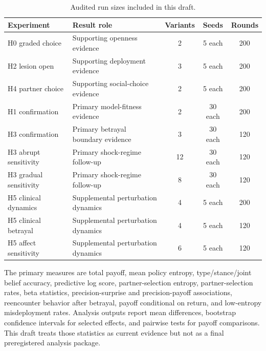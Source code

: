 \begin{table}[t]
\centering
\caption{Audited run sizes included in this draft.}
\label{tab:run-sizes}
\begin{tabularx}{\linewidth}{lXccc}
\toprule
Experiment & Result role & Variants & Seeds & Rounds \\
\midrule
H0 graded choice & Supporting openness evidence & 2 & 5 each & 200 \\
H2 lesion open & Supporting deployment evidence & 3 & 5 each & 200 \\
H4 partner choice & Supporting social-choice evidence & 2 & 5 each & 200 \\
H1 confirmation & Primary model-fitness evidence & 2 & 30 each & 200 \\
H3 confirmation & Primary betrayal boundary evidence & 3 & 30 each & 120 \\
H3 abrupt sensitivity & Primary shock-regime follow-up & 12 & 30 each & 120 \\
H3 gradual sensitivity & Primary shock-regime follow-up & 8 & 30 each & 120 \\
H5 clinical dynamics & Supplemental perturbation dynamics & 4 & 5 each & 200 \\
H5 clinical betrayal & Supplemental perturbation dynamics & 4 & 5 each & 120 \\
H5 affect sensitivity & Supplemental perturbation dynamics & 6 & 5 each & 120 \\
\bottomrule
\end{tabularx}
\end{table}

The primary measures are total payoff, mean policy entropy, type/stance/joint belief accuracy, predictive log score, partner-selection entropy, partner-selection rates, beta statistics, precision-surprise and precision-payoff associations, reencounter behavior after betrayal, payoff conditional on return, and low-entropy misdeployment rates. Analysis outputs report mean differences, bootstrap confidence intervals for selected effects, and pairwise tests for payoff comparisons. This draft treats those statistics as current evidence but not as a final preregistered analysis package.
